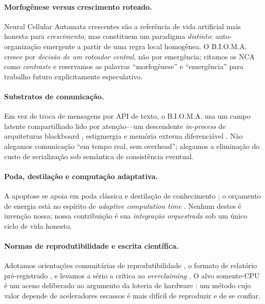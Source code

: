 \documentclass[11pt]{article}
\newcommand{\bioma}{\textsc{B.I.O.M.A.}}
\begin{document}
\paragraph{Morfogênese versus crescimento roteado.}
Neural Cellular Automata crescentes \cite{mordvintsev2020growing} são a
referência de vida artificial mais honesta para \emph{crescimento}, mas
constituem um paradigma \emph{distinto}: auto-organização emergente a partir de
uma regra local homogênea. O \bioma{} cresce por \emph{decisão de um roteador
central}, não por emergência; citamos os NCA como \emph{contraste} e reservamos as
palavras ``morfogênese'' e ``emergência'' para trabalho futuro explicitamente
especulativo.

\paragraph{Substratos de comunicação.}
Em vez de troca de mensagens por API de texto, o \bioma{} usa um campo latente
compartilhado lido por atenção---um descendente \emph{in-process} de arquiteturas
blackboard \cite{hayesroth1985blackboard}, estigmergia \cite{dorigo1996ant} e
memória externa diferenciável \cite{graves2016dnc,vaswani2017attention}. Não
alegamos comunicação ``em tempo real, sem overhead''; alegamos a eliminação do
custo de serialização sob semântica de consistência eventual.

\paragraph{Poda, destilação e computação adaptativa.}
A apoptose se apoia em poda clássica \cite{lecun1990obd,frankle2019lottery} e
destilação de conhecimento \cite{hinton2015distill}; o orçamento de energia está
no espírito de \emph{adaptive computation time} \cite{graves2016act}. Nenhum
destes é invenção nossa; nossa contribuição é sua \emph{integração orquestrada}
sob um único ciclo de vida honesto.

\paragraph{Normas de reprodutibilidade e escrita científica.}
Adotamos orientações comunitárias de reprodutibilidade
\cite{pineau2021repro,gundersen2018repro}, o formato de relatório pré-registrado
\cite{chambers2013registered}, e levamos a sério a crítica ao \emph{overclaiming}
\cite{lipton2019troubling}. O alvo somente-CPU é um aceno deliberado ao argumento
da loteria de hardware \cite{hooker2021hardware}: um método cujo valor depende de
aceleradores escassos é mais difícil de reproduzir e de se confiar.
\end{document}
